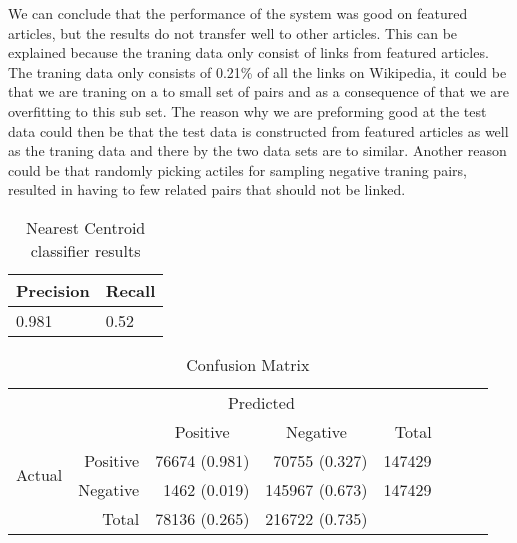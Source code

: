We can conclude that the performance of the system was good on featured articles, but the results do not transfer well to other articles. This can be explained because the traning data only consist of links from featured articles. 
The traning data only consists of 0.21\% of all the links on Wikipedia, it could be that we are traning on a to small set of pairs and as a consequence of that we are overfitting to this sub set. The reason why we are preforming good at the test data could then be that the test data is constructed from featured articles as well as the traning data and there by the two data sets are to similar. Another reason could be that randomly picking actiles for sampling negative traning pairs, resulted in having to few related pairs that should not be linked. 

\begin{table}[htbp]
\centering
\begin{tabular}{@{}ll@{}}
\toprule
Precision     & Recall       \\ \midrule
\num{0.981} & \num{0.52} \\
\bottomrule
\end{tabular}
\caption[Nearest Centroid classifier results]{Nearest Centroid classifier results}\label{eval-results}
\end{table}

\begin{table}[htbp]
    \centering
     \begin{tabular}{rrrrrrrr}
      \toprule
      \multicolumn{2}{c}{} & \multicolumn{2}{c}{Predicted} & \\
      \cmidrule{3-4}
      \multicolumn{2}{c}{} & \multicolumn{1}{c}{Positive} & \multicolumn{1}{c}{Negative} & Total \\
      \midrule
      \multirow{2}{*}{Actual} & Positive & \num{76674} (0.981) & \num{70755} (0.327)  & \num{147429} \\
                              & Negative & \num{1462} (0.019)  & \num{145967} (0.673) & \num{147429} \\ \cmidrule{1-2}
                              & Total    & \num{78136} (0.265) & \num{216722} (0.735) \\
      \bottomrule
    \end{tabular}
    \caption[Confusion Matrix]{Confusion Matrix}%
    \label{tab:confusionmatrix}
\end{table}



